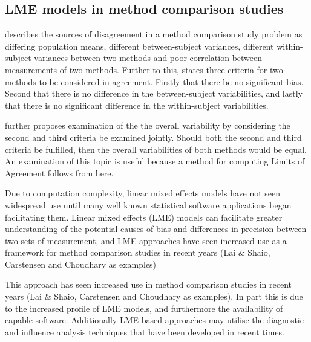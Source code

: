 \documentclass[12pt, a4paper]{report}
\theoremstyle{plain}
\theoremstyle{definition}
\theoremstyle{remark}
\begin{document}
	
	
	\subsection{LME models in method comparison studies}
	
	
	
	
	
	
	\citet{Barnhart} describes the sources of disagreement in a method comparison study problem as
	differing population means, different between-subject variances, different within-subject variances between two methods and poor
	correlation between measurements of two methods. Further to this, \citet{ARoy2009} states three criteria for two methods to be considered in agreement. Firstly that there be no significant bias. Second that there is no difference in the between-subject variabilities, and lastly that there is no significant difference in the within-subject variabilities. 	
	
	\citet{ARoy2009} further proposes examination of the the overall variability by considering the second and third criteria be examined jointly. Should both the second and third criteria be fulfilled, then the overall variabilities of both methods would be equal. An examination of this topic is useful because a method for computing Limits of Agreement follows from here.
	
	
	Due to computation complexity, linear mixed effects models have not seen widespread use until many well known statistical software applications began facilitating them. Linear mixed effects (LME) models can facilitate greater understanding of the potential causes of bias and differences in precision between two sets of measurement, and LME approaches have seen increased use as a framework for method comparison studies in recent years (Lai $\&$ Shaio, Carstensen and Choudhary as examples)
	
	
	This approach has seen increased use in method comparison studies in recent years (Lai \& Shaio, Carstensen and Choudhary as examples). In part this is due to the increased profile of LME models, and furthermore the availability of capable software. Additionally LME based approaches may utilise the diagnostic and influence analysis techniques that have been developed in recent times.
	
\end{document}
